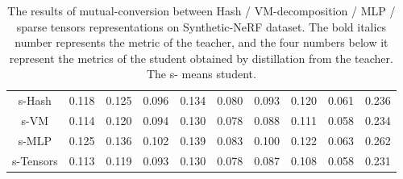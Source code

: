 \documentclass[letterpaper]{article} \usepackage{aaai23}  \usepackage{times}  \usepackage{helvet}  \usepackage{courier}  \usepackage[hyphens]{url}  \usepackage{graphicx} \urlstyle{rm} \def\UrlFont{\rm}  \usepackage{natbib}  \usepackage{caption} \frenchspacing  \setlength{\pdfpagewidth}{8.5in}  \setlength{\pdfpageheight}{11in}  \usepackage{multirow}
\begin{document}
\begin{table*}[t]
{\begin{tabular}{c|ccccccccc}
s-Hash                      & 0.118                   & 0.125                   & 0.096                   & 0.134                   & 0.080                   & 0.093                   & 0.120                   & 0.061                   & 0.236                   \\
s-VM                        & 0.114                   & 0.120                   & 0.094                   & 0.130                   & 0.078                   & 0.088                   & 0.111                   & 0.058                   & 0.234                   \\
s-MLP                       & 0.125                   & 0.136                   & 0.102                   & 0.139                   & 0.083                   & 0.100                   & 0.122                   & 0.063                   & 0.262                   \\
s-Tensors                   & 0.113                   & 0.119                   & 0.093                   & 0.130                   & 0.078                   & 0.087                   & 0.108                   & 0.058                   & 0.231                   \\ \hline
\end{tabular}
}
\caption{ The  results of mutual-conversion between Hash / VM-decomposition / MLP / sparse tensors representations on  Synthetic-NeRF dataset. The bold italics number represents the metric of the teacher, and the four numbers below it represent the metrics of the student obtained by distillation from the teacher. The s- means
student.}
\label{tab-vgg-mutual-syn}
\end{table*}
\end{document}
